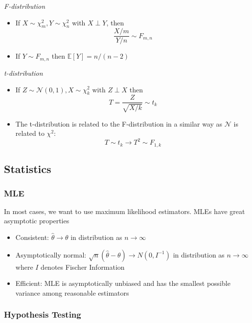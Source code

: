 \documentclass[11pt, %
	oneside, %
	english, %
	onehalfspacing, %
	]{article} %
\numberwithin{equation}{section}
\begin{document}
\emph{F-distribution}

\begin{itemize}
    \item If $X \sim \chi^2_m, Y \sim \chi^2_n$ with $X \perp Y$, then
    $$
    \frac{X / m}{Y / n} \sim F_{m,n}
    $$
    \item If $Y \sim F_{m,n}$ then $\mathbb{E} \left[ Y\right] = n /(n-2)$
\end{itemize}


\emph{t-distribution}

\begin{itemize}
    \item If $Z \sim \mathcal{N}(0,1), X \sim \chi^2_k$ with $Z \perp X$ then
    $$
    T = \frac{Z}{\sqrt{ X / k }} \sim t_k
    $$
    \item The t-distribution is related to the F-distribution in a similar way as $\mathcal{N}$ is related to $\chi^2$:
    \begin{equation*}
        T \sim t_k \rightarrow T^2 \sim F_{1, k}
    \end{equation*}
\end{itemize}




\subsection{Statistics}

\subsubsection{MLE}

In most cases, we want to use maximum likelihood estimators. MLEs have great asymptotic properties
\begin{itemize}
    \item Consistent: $\hat{\theta} \to \theta$ in distribution as $n \to \infty$
    \item Asymptotically normal: $\sqrt{n}(\hat{\theta}-\theta) \rightarrow N\left(0, I^{-1}\right)$ in distribution as $n \to \infty$ where $I$ denotes Fischer Information
    \item Efficient: MLE is asymptotically unbiased and has the smallest possible variance among reasonable estimators
\end{itemize}


\subsubsection{Hypothesis Testing}
\end{document}
